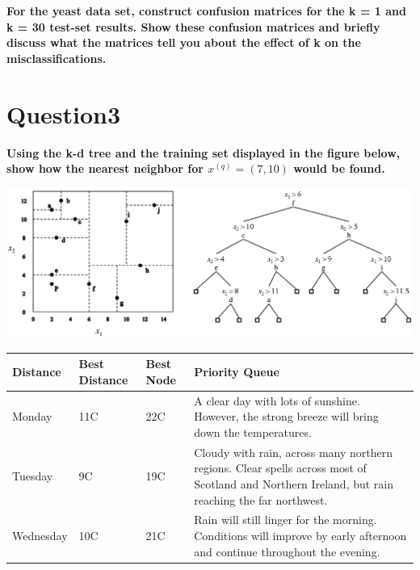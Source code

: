 \documentclass[paper=a4, fontsize=11pt]{scrartcl} %
\numberwithin{equation}{section} %
\numberwithin{figure}{section} %
\numberwithin{table}{section} %
\begin{document}
\textbf{For the yeast data set, construct confusion matrices for the k = 1 and k = 30 test-set results. Show these confusion matrices and briefly discuss what the matrices tell you about the effect of k on the misclassifications.}


\newpage
\section*{Question3}

\textbf{Using the k-d tree and the training set displayed in the figure below, show how the nearest neighbor for $x^{(q)} = (7, 10)$ would be found.\\}

\includegraphics[scale=.4]{pics/question3.png}



\begin{center}
    \begin{tabular}{ | l | l | l | p{6cm} |}
    \hline
    Distance & Best Distance & Best Node & Priority Queue \\ \hline
    Monday & 11C & 22C & A clear day with lots of sunshine.  
    However, the strong breeze will bring down the temperatures. \\ \hline
    
    Tuesday & 9C & 19C & Cloudy with rain, across many northern regions. 	Clear spells across most of Scotland and Northern Ireland, 
    but rain reaching the far northwest. \\ \hline
    
    Wednesday & 10C & 21C & Rain will still linger for the morning. 
    Conditions will improve by early afternoon and continue 
    throughout the evening. \\
    \hline
    \end{tabular}
\end{center}
\end{document}
